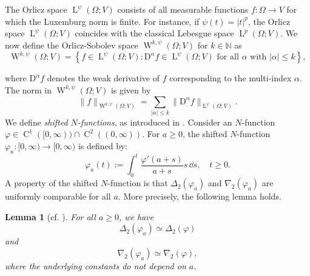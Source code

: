 \documentclass[a4paper,11pt]{amsart}
\numberwithin{equation}{section}
\newcommand{\lebe}{\operatorname{L}}
\newcommand{\sobo}{\operatorname{W}}
\newcommand{\hold}{\operatorname{C}}
\newtheorem{lemma}[defi]{Lemma}
\begin{document}
	\noindent
	The Orlicz space $\lebe^\psi(\Omega;V)$ consists of all measurable functions $f: \Omega \to V$ for which the Luxemburg norm is finite. For instance, if $\psi(t) = |t|^p$, the Orlicz space $\lebe^\psi(\Omega;V)$ coincides with the classical Lebesgue space $\lebe^p(\Omega;V)$. 
	We now define the Orlicz-Sobolev space $\sobo^{k , \psi}(\Omega; V)$ for $k \in \mathbb{N}$ as
	\begin{equation*}
		\sobo^{k, \psi}(\Omega; V) = \left\{ f \in \lebe^\psi(\Omega; V) : \mathrm{D}^\alpha f \in \lebe^\psi(\Omega; V) \text{ for all  } \alpha \text{ with } |\alpha| \leq k \right\},
	\end{equation*}
	
	\noindent
	where $\mathrm{D}^\alpha f$ denotes the weak derivative of $f$ corresponding to the multi-index $\alpha$. The norm in $\sobo^{k, \psi}(\Omega; V)$ is given by
	\begin{equation*}
		\|f\|_{\sobo^{k, \psi}(\Omega; V)} = \sum_{|\alpha| \leq k} \|\mathrm{D}^\alpha f\|_{\lebe^\psi(\Omega; V)}.
	\end{equation*}
	We define \emph{shifted $ N $-functions}, as introduced in \cite{DieningEttwein+2008+523+556, diening_relaxed_2020_1}. Consider an $ N $-function $\varphi \in \hold^1([0, \infty)) \cap \hold^2((0, \infty))$. For $ a \geq 0 $, the shifted $ N $-function $\varphi_a: [0, \infty) \to [0, \infty)$ is defined by:
	\begin{equation}
		\varphi_a(t) := \int_0^t \frac{\varphi'(a+s)}{a+s}s \,\dd{s}, \quad t \geq 0. \label{eq:shift}
	\end{equation}
	A property of the shifted $N$-function is that $\Delta_2(\varphi_a)$ and $\nabla_2(\varphi_a)$ are uniformly comparable for all $a$. More precisely, the following lemma holds.
	
	\begin{lemma}[{{cf. \cite[Remark 38]{diening_relaxed_2020_1}}}] \label{Delta:Nabla:Comp}
		For all $a \geq 0$, we have
		\[
		\Delta_2(\varphi_a) \simeq \Delta_2(\varphi)
		\]
		and
		\[
		\nabla_2(\varphi_a) \simeq \nabla_2(\varphi),
		\]
		where the underlying constants do not depend on $a$.
	\end{lemma}
	
\end{document}
